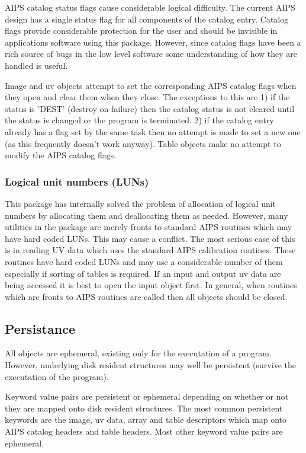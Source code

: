    AIPS catalog status flags cause considerable logical difficulty.
The current AIPS design has a single status flag for all components of
the catalog entry.  Catalog flags provide considerable protection
for the user and should be invisible in applications software using
this package.  However, since catalog flags have been a rich source of
bugs in the low level software some understanding of how they are
handled is useful.

   Image and uv objects attempt to  set the corresponding AIPS catalog
flags when they open and clear them when they close.  The exceptions
to this are 1) if the status is 'DEST' (destroy on failure) then the
catalog status is not cleared until the status is changed or the
program is terminated.  2) if the catalog entry already has a flag set
by the same task then no attempt is made to set a new one (as this
frequently doesn't work anyway).  Table objects make no attempt to
modify the AIPS catalog flags.

\subsubsection {Logical unit numbers (LUNs)}
   This package has internally solved the problem of allocation of
logical unit numbers by allocating them and deallocating them as
needed.  However, many utilities in the package are merely fronts to
standard AIPS routines which may have hard coded LUNs.  This may cause
a conflict.  The most serious case of this is in reading UV data which
uses the standard AIPS calibration routines.  These routines have hard
coded LUNs and may use a considerable number of them especially if
sorting of tables is required.  If an input and output uv data are
being accessed it is best to open the input object first.  In general,
when routines which are fronts to AIPS routines are called then all
objects should be closed.


\subsection{Persistance}

   All objects are ephemeral, existing only for the executation of a
program.  However, underlying disk resident structures may well be
persistent (survive the executation of the program).

   Keyword value pairs are persistent or ephemeral depending on
whether or not they are mapped onto disk resident structures.  The
most common persistent keywords are the image, uv data, array and
table descriptors which map onto AIPS catalog headers and table
headers.  Most other keyword value pairs are ephemeral.

